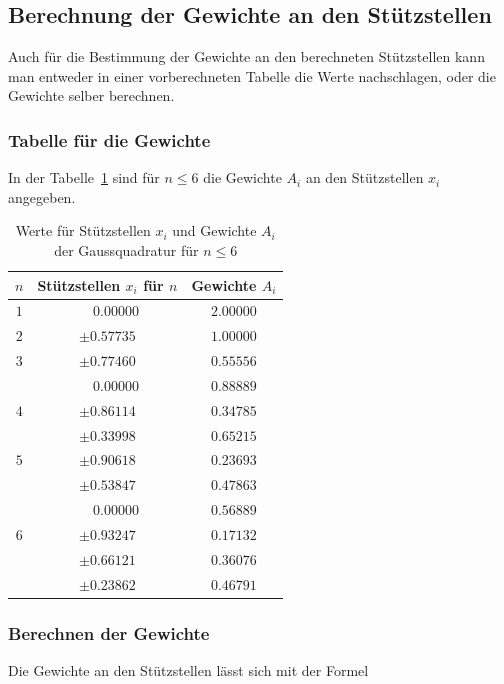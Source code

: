 \subsection{Berechnung der Gewichte an den Stützstellen
\label{quadratur:subsection:gewichtsberechnung}}
Auch für die Bestimmung der Gewichte an den berechneten Stützstellen kann man entweder
in einer vorberechneten Tabelle die Werte nachschlagen, oder die Gewichte selber berechnen.

\subsubsection{Tabelle für die Gewichte}
In der Tabelle~\ref{buch:table:gaussgewichtwerte} sind für $ n \leq 6 $ die Gewichte $A_{i}$
an den Stützstellen $x_{i} $ angegeben.

\begin{table}[h!]
    \centering
    \begin{tabular}{|c|c|c|}
        \hline
        $n$ & Stützstellen $x_{i}$ für $n$ & Gewichte $A_{i}$\\
        \hline
        $1$ & $ \phantom{-} 0.00000 $ & $ 2.00000 $ \\
        \hline
        $2$ & $ \pm 0.57735 $ & $ 1.00000 $ \\
        \hline
        $3$ & $ \pm 0.77460 $ & $ 0.55556 $ \\
            & $ \phantom{-} 0.00000 $ & $ 0.88889 $ \\
        \hline
        $4$ & $ \pm 0.86114 $ & $ 0.34785 $ \\
            & $ \pm 0.33998 $ & $ 0.65215 $ \\
        \hline
        $5$ & $ \pm 0.90618 $ & $ 0.23693 $ \\
            & $ \pm 0.53847 $ & $ 0.47863 $ \\
            & $ \phantom{-} 0.00000 $ & $ 0.56889 $ \\
        \hline
        $6$ & $ \pm 0.93247 $ & $ 0.17132 $ \\
            & $ \pm 0.66121 $ & $ 0.36076 $ \\
            & $ \pm 0.23862 $ & $ 0.46791 $ \\
        \hline
    \end{tabular}
    \caption{Werte für Stützstellen $x_{i}$ und Gewichte $A_{i}$ der Gaussquadratur für $n \leq 6$
    \label{buch:table:gaussgewichtwerte}}    
\end{table}

\subsubsection{Berechnen der Gewichte}
Die Gewichte an den Stützstellen lässt sich mit der Formel

